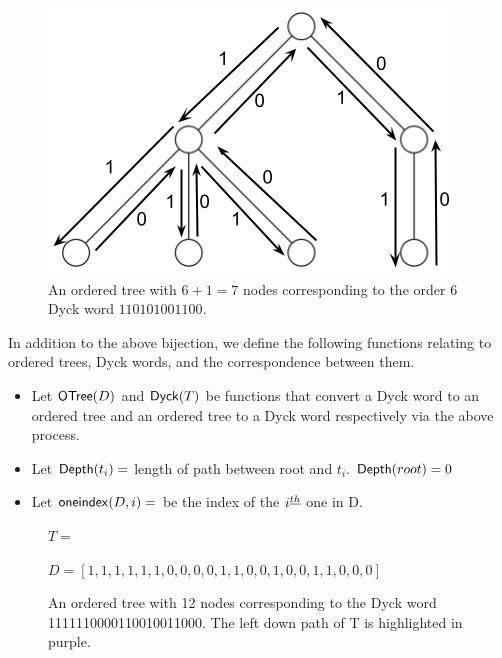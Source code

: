 \begin{figure}
    \centering
    \includegraphics{otreebij.png}
    \caption{An ordered tree with $6+1=7$ nodes corresponding to the order 6 Dyck word $110101001100$.}
    \label{ordered_tree_bijection_illustration}
\end{figure}


In addition to the above bijection, we define the following functions relating to ordered trees, Dyck words, and the correspondence between them.

\begin{itemize}
    \item Let $\mathsf{OTree}{(D)}$ and $\mathsf{Dyck}{(T)}$ be functions that convert a Dyck word to an ordered tree and an ordered tree to a Dyck word respectively via the above process.
    \item Let $\mathsf{Depth}{(t_i)}=$ length of path between root and $t_i$. $\mathsf{Depth}{(root)}=0$
    \item Let $\mathsf{oneindex}({D}, i)=$ be the index of the $i^{\underline{th}}{}$ one in D.
\end{itemize}

\bigskip

\begin{figure}
    \centering
    $T=$


    $D=[1, 1, 1, 1, 1, 1, 0, 0, 0, 0, 1, 1, 0, 0, 1, 0, 0, 1, 1, 0, 0, 0]$
    \caption{An ordered tree with 12 nodes corresponding to the Dyck word 1111110000110010011000.  The left down path of T is highlighted in purple. }
    \label{exampleotree}
\end{figure}


